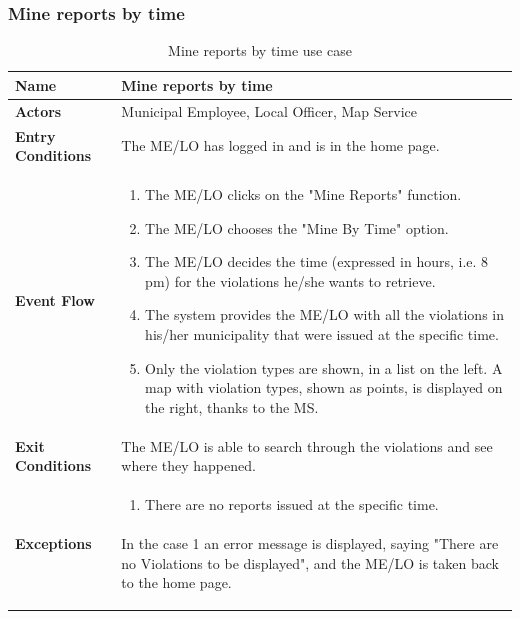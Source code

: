 					\subsubsection{Mine reports by time}
					\begin{table}[!h]
						\centering
						\vspace{-2mm}
						\begin{tabular}{lp{}}
							\toprule
							\textbf{Name} & \textbf{Mine reports by time} \\[1mm]
							\midrule
							\textbf{Actors} & Municipal Employee, Local Officer, Map Service \\[1mm]
							\textbf{Entry Conditions} & The ME/LO has logged in and is in the home page. \vspace{1mm}\\
							\textbf{Event Flow} &
							\vspace{-5mm} 
							\begin{enumerate}
								\setlength\itemsep{0.2mm}
								\item The ME/LO clicks on the "Mine Reports" function.
								\item The ME/LO chooses the "Mine By Time" option.
								\item The ME/LO decides the time (expressed in hours, i.e. 8 pm) for the violations he/she wants to retrieve.
								\item The system provides the ME/LO with all the violations in his/her municipality that were issued at the specific time.
								\item Only the violation types are shown, in a list on the left. A map with violation types, shown as points, is displayed on the right, thanks to the MS.
							\end{enumerate} \\
							\textbf{Exit Conditions} & The ME/LO is able to search through the violations and see where they happened. \vspace{1mm}\\
							\textbf{Exceptions} & 
								\vspace{-5mm} 
								\begin{enumerate}
									\item There are no reports issued at the specific time.
								\end{enumerate}
								\vspace{-7mm}
								\paragraph{}
									In the case 1 an error message is displayed, saying "There are no Violations to be displayed", and the ME/LO is taken back to the home page. \\
							\bottomrule
						\end{tabular}
						\caption{Mine reports by time use case}
					\end{table}
					\clearpage
